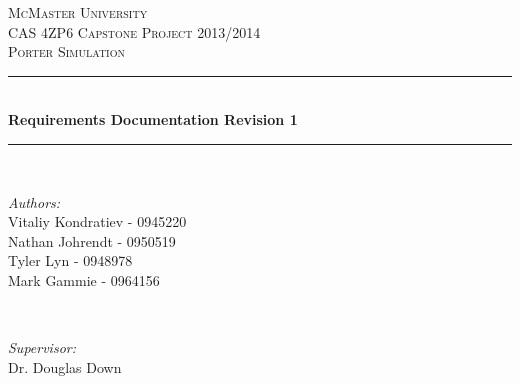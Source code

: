 \documentclass[paper=letter, fontsize=10pt]{scrartcl}
\numberwithin{equation}{section}		%
\numberwithin{figure}{section}			%
\numberwithin{table}{section}				%
\begin{document}
\begin{titlepage}

\newcommand{\HRule}{\rule{\linewidth}{0.5mm}} %

\begin{center}
 

\textsc{\LARGE McMaster University}\\[1.5cm] %
\textsc{\Large CAS 4ZP6 Capstone Project 2013/2014}\\[0.5cm] %
\textsc{\large Porter Simulation}\\[0.5cm] %


\HRule \\[0.4cm]
{ \huge \bfseries Requirements Documentation Revision 1}\\[0.4cm] %
\HRule \\[1.5cm]
 

\begin{minipage}{0.4\textwidth}
\begin{flushleft} \large
\emph{Authors:}\\
Vitaliy Kondratiev - 0945220\\
Nathan Johrendt - 0950519\\
Tyler Lyn - 0948978\\
Mark Gammie - 0964156
\end{flushleft}
\end{minipage}
~
\begin{minipage}{0.4\textwidth}
\begin{flushright} \large
\emph{Supervisor:} \\
Dr. Douglas Down %
\end{flushright}
\end{minipage}\\[4cm]


\end{center}
\end{titlepage}
\end{document}
